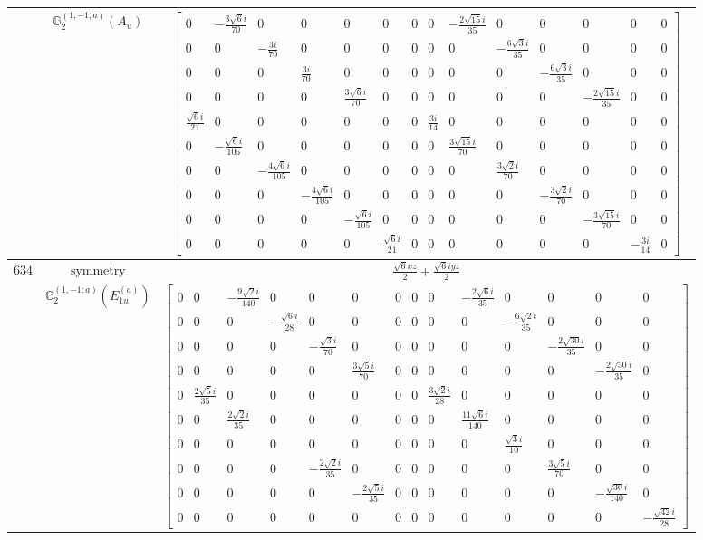 \documentclass[fleqn,8pt,landscape]{jsarticle}
\begin{document}
\begin{longtable}{ccc}
$  $ & $ \mathbb{G}_{2}^{(1,-1;a)}(A_{u}) $ & $ \begin{bmatrix} 0 & - \frac{3 \sqrt{6} i}{70} & 0 & 0 & 0 & 0 & 0 & 0 & - \frac{2 \sqrt{15} i}{35} & 0 & 0 & 0 & 0 & 0 \\ 0 & 0 & - \frac{3 i}{70} & 0 & 0 & 0 & 0 & 0 & 0 & - \frac{6 \sqrt{3} i}{35} & 0 & 0 & 0 & 0 \\ 0 & 0 & 0 & \frac{3 i}{70} & 0 & 0 & 0 & 0 & 0 & 0 & - \frac{6 \sqrt{3} i}{35} & 0 & 0 & 0 \\ 0 & 0 & 0 & 0 & \frac{3 \sqrt{6} i}{70} & 0 & 0 & 0 & 0 & 0 & 0 & - \frac{2 \sqrt{15} i}{35} & 0 & 0 \\ \frac{\sqrt{6} i}{21} & 0 & 0 & 0 & 0 & 0 & 0 & \frac{3 i}{14} & 0 & 0 & 0 & 0 & 0 & 0 \\ 0 & - \frac{\sqrt{6} i}{105} & 0 & 0 & 0 & 0 & 0 & 0 & \frac{3 \sqrt{15} i}{70} & 0 & 0 & 0 & 0 & 0 \\ 0 & 0 & - \frac{4 \sqrt{6} i}{105} & 0 & 0 & 0 & 0 & 0 & 0 & \frac{3 \sqrt{2} i}{70} & 0 & 0 & 0 & 0 \\ 0 & 0 & 0 & - \frac{4 \sqrt{6} i}{105} & 0 & 0 & 0 & 0 & 0 & 0 & - \frac{3 \sqrt{2} i}{70} & 0 & 0 & 0 \\ 0 & 0 & 0 & 0 & - \frac{\sqrt{6} i}{105} & 0 & 0 & 0 & 0 & 0 & 0 & - \frac{3 \sqrt{15} i}{70} & 0 & 0 \\ 0 & 0 & 0 & 0 & 0 & \frac{\sqrt{6} i}{21} & 0 & 0 & 0 & 0 & 0 & 0 & - \frac{3 i}{14} & 0 \end{bmatrix} $ \\ \hline
$ 634 $ & $ \text{symmetry} $ & $ \frac{\sqrt{6} x z}{2} + \frac{\sqrt{6} i y z}{2} $ \\
$  $ & $ \mathbb{G}_{2}^{(1,-1;a)}(E_{1u}^{(a)}) $ & $ \begin{bmatrix} 0 & 0 & - \frac{9 \sqrt{2} i}{140} & 0 & 0 & 0 & 0 & 0 & 0 & - \frac{2 \sqrt{6} i}{35} & 0 & 0 & 0 & 0 \\ 0 & 0 & 0 & - \frac{\sqrt{6} i}{28} & 0 & 0 & 0 & 0 & 0 & 0 & - \frac{6 \sqrt{2} i}{35} & 0 & 0 & 0 \\ 0 & 0 & 0 & 0 & - \frac{\sqrt{3} i}{70} & 0 & 0 & 0 & 0 & 0 & 0 & - \frac{2 \sqrt{30} i}{35} & 0 & 0 \\ 0 & 0 & 0 & 0 & 0 & \frac{3 \sqrt{5} i}{70} & 0 & 0 & 0 & 0 & 0 & 0 & - \frac{2 \sqrt{30} i}{35} & 0 \\ 0 & \frac{2 \sqrt{5} i}{35} & 0 & 0 & 0 & 0 & 0 & 0 & \frac{3 \sqrt{2} i}{28} & 0 & 0 & 0 & 0 & 0 \\ 0 & 0 & \frac{2 \sqrt{2} i}{35} & 0 & 0 & 0 & 0 & 0 & 0 & \frac{11 \sqrt{6} i}{140} & 0 & 0 & 0 & 0 \\ 0 & 0 & 0 & 0 & 0 & 0 & 0 & 0 & 0 & 0 & \frac{\sqrt{3} i}{10} & 0 & 0 & 0 \\ 0 & 0 & 0 & 0 & - \frac{2 \sqrt{2} i}{35} & 0 & 0 & 0 & 0 & 0 & 0 & \frac{3 \sqrt{5} i}{70} & 0 & 0 \\ 0 & 0 & 0 & 0 & 0 & - \frac{2 \sqrt{5} i}{35} & 0 & 0 & 0 & 0 & 0 & 0 & - \frac{\sqrt{30} i}{140} & 0 \\ 0 & 0 & 0 & 0 & 0 & 0 & 0 & 0 & 0 & 0 & 0 & 0 & 0 & - \frac{\sqrt{42} i}{28} \end{bmatrix} $ \\ \hline

\end{longtable}
\end{document}
